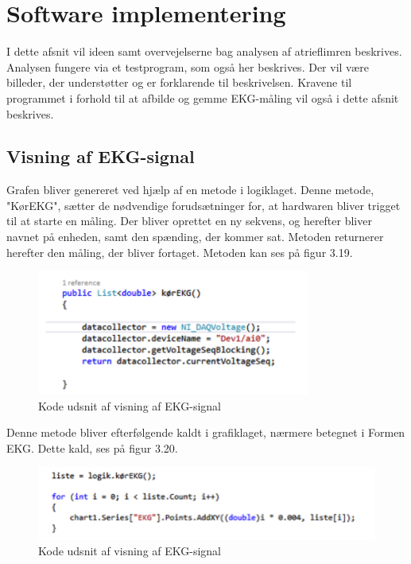 \section{Software implementering}
I dette afsnit vil ideen samt overvejelserne bag analysen af atrieflimren beskrives. Analysen fungere via et testprogram, som også her beskrives. Der vil være billeder, der understøtter og er forklarende til beskrivelsen. Kravene til programmet i forhold til at afbilde og gemme EKG-måling vil også i dette afsnit beskrives. 

\subsection{Visning af EKG-signal}
Grafen bliver genereret ved hjælp af en metode i logiklaget. Denne metode, "KørEKG", sætter de nødvendige forudsætninger for, at hardwaren bliver trigget til at starte en måling. Der bliver oprettet en ny sekvens, og herefter bliver navnet på enheden, samt den spænding, der kommer sat. Metoden returnerer herefter den måling, der bliver fortaget. Metoden kan ses på figur 3.19.

\begin{figure}[H]
	\centering
	\includegraphics[width=0.8\textwidth]{Figurer/Snip20150525_39}
	\caption{Kode udsnit af visning af EKG-signal}
\end{figure}

Denne metode bliver efterfølgende kaldt i grafiklaget, nærmere betegnet i Formen EKG. Dette kald, ses på figur 3.20.

\begin{figure}[H]
	\centering
	\includegraphics[width=1\textwidth]{Figurer/Snip20150525_40}
	\caption{Kode udsnit af visning af EKG-signal}
\end{figure}

